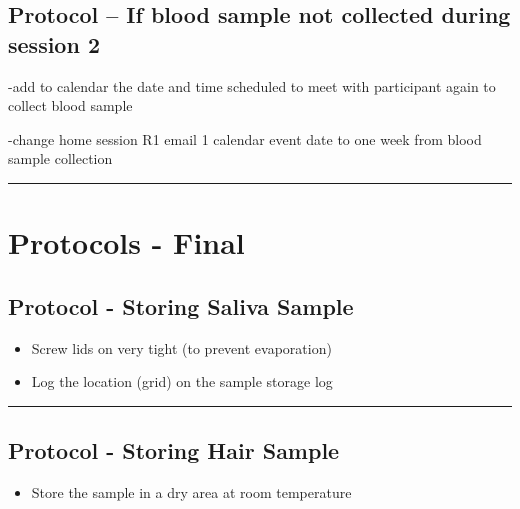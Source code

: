 \documentclass[]{book}
\providecommand{\tightlist}{%
  \setlength{\itemsep}{0pt}\setlength{\parskip}{0pt}}
\begin{document}
\hypertarget{protocol-if-blood-sample-not-collected-during-session-2}{%
\subsection{Protocol -- If blood sample not collected during session 2}\label{protocol-if-blood-sample-not-collected-during-session-2}}

-add to calendar the date and time scheduled to meet with participant again to collect blood sample

-change home session R1 email 1 calendar event date to one week from blood sample collection

\begin{center}\rule{0.5\linewidth}{0.5pt}\end{center}

\hypertarget{protocols---final-1}{%
\section{Protocols - Final}\label{protocols---final-1}}

\hypertarget{protocol---storing-saliva-sample-1}{%
\subsection{Protocol - Storing Saliva Sample}\label{protocol---storing-saliva-sample-1}}

\begin{itemize}
\item
  Screw lids on very tight (to prevent evaporation)
\item
  Log the location (grid) on the sample storage log
\end{itemize}

\begin{center}\rule{0.5\linewidth}{0.5pt}\end{center}

\hypertarget{protocol---storing-hair-sample-1}{%
\subsection{Protocol - Storing Hair Sample}\label{protocol---storing-hair-sample-1}}

\begin{itemize}
\tightlist
\item
  Store the sample in a dry area at room temperature
\end{itemize}
\end{document}
